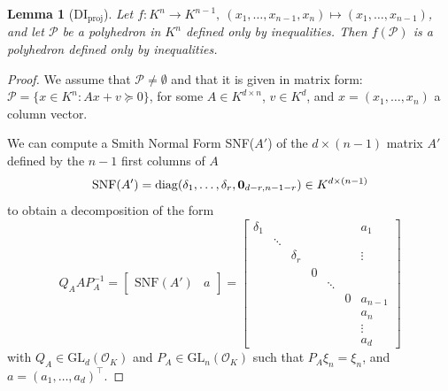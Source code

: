 \documentclass[sigconf]{acmart}
\newcommand{\PP}{\mathcal{P}}
\newtheorem{lemma}[theorem]{Lemma}
\newcommand{\OK}{\mathcal{O}_K}
\def\diag{\mathrm{diag}}
\newcommand{\GL}{\mathrm{GL}}
\begin{document}
\begin{lemma}[DI${}_{\mathrm{proj}}$]
  Let $f : K^n \to K^{n-1}, \: (x_1,\dots,x_{n-1},x_n) \mapsto (x_1,\dots,x_{n-1})$, and let
  $\PP$ be a polyhedron in $K^n$ defined only by inequalities. 
  Then $f(\PP)$ is a polyhedron defined only by inequalities. \label{lem:DIproj}
\end{lemma}
\begin{proof}
  We assume that $\PP \neq \emptyset$ and that it is given in
  matrix form: $\PP = \{x \in K^n : Ax+v \succeq 0\}$, for some 
  $A \in K^{d \times n}$, $v \in K^d$,
  and $x=(x_1,\dots,x_n)$ a column vector. 

  We can compute a Smith Normal Form SNF($A'$)
  of the $d \times (n-1)$ matrix $A'$ defined by the 
  $n-1$ first columns of $A$
  \[
\mathrm{SNF}(A') = \diag(\delta_1,\ldots,\delta_r,{\bf 0}_{d-r,n-1-r}) \in K^{d \times (n-1)}
\]
to obtain a decomposition of the form
\[
Q_A A P_A^{-1} =
\begin{bmatrix}
 \mathrm{SNF}(A') & a
\end{bmatrix}
=
\left[
\begin{smallmatrix}
\delta_1 &        &          &   &        &   & a_1     \\[-.25cm]
         & \ddots &          &   &        &   &         \\[-.35cm]
         &	  & \delta_r &   &        &   &  \vdots \\
         &	  &          & 0 &        &   &         \\[-.25cm]
         &	  &          &   & \ddots &   &         \\
         &	  &          &   &	  & 0 & a_{n-1} \\ 
         &	  &          &   &	  &   & a_n 	\\
         &	  &          &   &	  &   & \vdots 	\\
         &	  &          &   &	  &   & a_d 	
\end{smallmatrix}
\right]
\]
with $Q_A \in \GL_d(\OK)$ and $P_A \in \GL_n(\OK)$ such that $P_A \xi_n = \xi_n$,
and $a = (a_1,\ldots,a_d)^\intercal$.


\end{proof}
\end{document}
